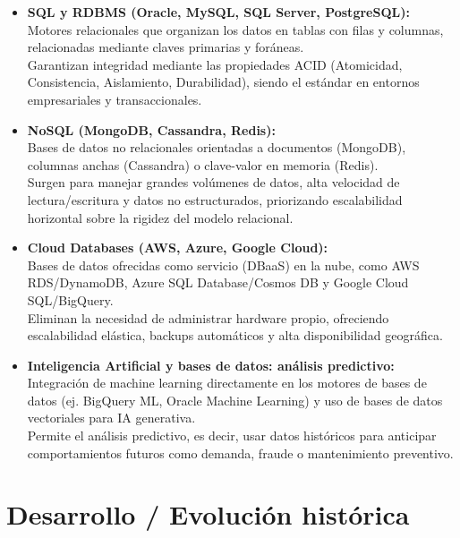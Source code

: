 \documentclass[12pt,a4paper]{article}
\begin{document}
\begin{itemize}
\item \textbf{SQL y RDBMS (Oracle, MySQL, SQL Server, PostgreSQL):} \\
  Motores relacionales que organizan los datos en tablas con filas y columnas, relacionadas mediante claves primarias y foráneas. \\
  Garantizan integridad mediante las propiedades ACID (Atomicidad, Consistencia, Aislamiento, Durabilidad), siendo el estándar en entornos empresariales y transaccionales.

\item \textbf{NoSQL (MongoDB, Cassandra, Redis):} \\
  Bases de datos no relacionales orientadas a documentos (MongoDB), columnas anchas (Cassandra) o clave-valor en memoria (Redis). \\
  Surgen para manejar grandes volúmenes de datos, alta velocidad de lectura/escritura y datos no estructurados, priorizando escalabilidad horizontal sobre la rigidez del modelo relacional.

\item \textbf{Cloud Databases (AWS, Azure, Google Cloud):} \\
  Bases de datos ofrecidas como servicio (DBaaS) en la nube, como AWS RDS/DynamoDB, Azure SQL Database/Cosmos DB y Google Cloud SQL/BigQuery. \\
  Eliminan la necesidad de administrar hardware propio, ofreciendo escalabilidad elástica, backups automáticos y alta disponibilidad geográfica.

\item \textbf{Inteligencia Artificial y bases de datos: análisis predictivo:} \\
  Integración de machine learning directamente en los motores de bases de datos (ej. BigQuery ML, Oracle Machine Learning) y uso de bases de datos vectoriales para IA generativa. \\
  Permite el análisis predictivo, es decir, usar datos históricos para anticipar comportamientos futuros como demanda, fraude o mantenimiento preventivo.
\end{itemize}

\section{Desarrollo / Evolución histórica}
\end{document}
